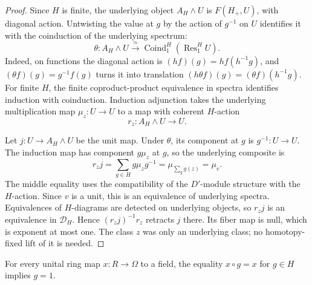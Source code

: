 \begin{proof}
Since \(H\) is finite, the underlying object \(A_H\wedge U\) is
\(F(H_+,U)\), with diagonal action.
Untwisting the value at \(g\) by the action of \(g^{-1}\) on \(U\)
identifies it with the coinduction of the underlying spectrum:
\[
 \theta:A_H\wedge U\xrightarrow{\ \simeq\ }
       \operatorname{Coind}_{1}^{H}(\operatorname{Res}_{1}^{H}U).
\]
Indeed, on functions the diagonal action is
\((h f)(g)=h f(h^{-1}g)\), and \((\theta f)(g)=g^{-1}f(g)\)
turns it into translation \((h\theta f)(g)=(\theta f)(h^{-1}g)\).
For finite \(H\), the finite coproduct-product equivalence in spectra
identifies induction with coinduction. Induction adjunction takes
the underlying multiplication map \(\mu_z:U\to U\) to a map with
coherent \(H\)-action
\[
 r_z:A_H\wedge U\longrightarrow U.
\]

Let \(j:U\to A_H\wedge U\) be the unit map. Under \(\theta\), its
component at \(g\) is \(g^{-1}:U\to U\). The induction map has
component \(g\mu_z\) at \(g\), so the underlying composite is
\[
 r_zj=\sum_{g\in H}g\mu_zg^{-1}
     =\mu_{\sum_g g(z)}=\mu_v.
\]
The middle equality uses the compatibility of the \(D'\)-module
structure with the \(H\)-action. Since \(v\) is a unit, this is an
equivalence of underlying spectra. Equivalences of \(H\)-diagrams
are detected on underlying objects, so \(r_zj\) is an equivalence
in \(\mathcal D_H\). Hence \((r_zj)^{-1}r_z\) retracts \(j\)
there. Its fiber map is null, which is exponent at most one.
The class \(z\) was only an underlying class; no homotopy-fixed
lift of it is needed.
\end{proof}

\begin{lemma}\label{wup:field-points}
For every unital ring map \(x:R\to\Omega\) to a field, the equality
\(x\circ g=x\) for \(g\in H\) implies \(g=1\).
\end{lemma}

